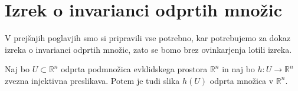 \documentclass[mat1]{fmfdelo}
\newcommand{\R}{\mathbb R}
\newcommand{\0}{\underline{0}}
\begin{document}
\section{Izrek o invarianci odprtih množic}\label{raz:ioiom}
V prejšnjih poglavjih smo si pripravili vse potrebno, kar potrebujemo za dokaz izreka o invarianci odprtih množic, zato se bomo brez ovinkarjenja lotili izreka.



\begin{izrek}\label{izr:main-theorem}
Naj bo $U \subset \R^n$ odprta podmnožica evklidskega prostora $\R^n$ in naj bo $h : U \rightarrow \R^n$ zvezna injektivna preslikava.
Potem je tudi slika $h(U)$ odprta množica v $\R^n$.
\end{izrek}
\end{document}
